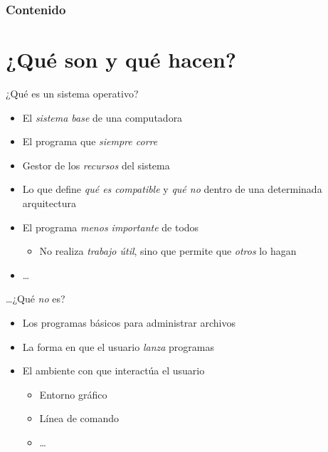 
\begin{frame}
  \frametitle{Contenido}
  \tableofcontents
\end{frame}

\section{¿Qué son y qué hacen?}

\begin{frame}{¿Qué es un sistema operativo?}
  \begin{itemize}
    \item El \emph{sistema base} de una computadora \pausa
    \item El programa que \emph{siempre corre} \pausa
    \item Gestor de los \emph{recursos} del sistema \pausa
    \item Lo que define \emph{qué es compatible} y \emph{qué no} dentro de una
          determinada arquitectura \pausa
    \item El programa \emph{menos importante} de todos \pausa
        \begin{itemize}
          \item No realiza \emph{trabajo útil}, sino que permite que \emph{otros} lo hagan
        \end{itemize}
    \item …
  \end{itemize}
\end{frame}

\begin{frame}{…¿Qué \emph{no} es?}
  \begin{itemize}
    \item Los programas básicos para administrar archivos
    \item La forma en que el usuario \emph{lanza} programas
    \item El ambiente con que interactúa el usuario
        \begin{itemize}
            \item Entorno gráfico
            \item Línea de comando
            \item …
        \end{itemize}
    \end{itemize}
\end{frame}

